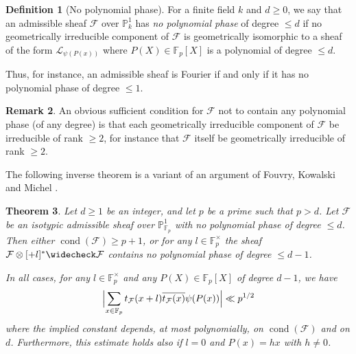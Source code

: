 \documentclass[12pt,a4paper,reqno]{amsart}
\numberwithin{equation}{section}
\DeclareMathOperator*\cond{cond}
\theoremstyle{plain}
\newtheorem{theorem}{Theorem}[section]
\theoremstyle{definition}
\newtheorem{definition}[theorem]{Definition}
\newtheorem{remark}[theorem]{Remark}
\newcommand\F{\mathbb{F}}
\newcommand\ov{\overline}
\newcommand\wcheck{\widecheck}
\newcommand\mcF{\mathcal{F}}
\newcommand\mcL{\mathcal{L}}
\newcommand\Pl{\mathbb{P}^1}
\newcommand\Fp{\F_{p}}
\newcommand\Fpt{\F_{p}^{\times}}
\begin{document}
\begin{definition}[No polynomial phase]
  For a finite field $k$ and $d\geq 0$, we say that an admissible
  sheaf $\mcF$ over $\Pl_k$ has \emph{no polynomial phase} of degree
  $\leq d$ if no geometrically irreducible component of $\mcF$ is
  geometrically isomorphic to a sheaf of the form $\mcL_{\psi(P(x))}$
  where $P(X)\in\Fp[X]$ is a polynomial of degree $\leq d$.
\end{definition}

Thus, for instance, an admissible sheaf is Fourier if and only if it
has no polynomial phase of degree $\leq 1$.

\begin{remark}\label{irrednopolynomialphase} 
  An obvious sufficient condition for $\mcF$ not to contain any
  polynomial phase (of any degree) is that each geometrically
  irreducible component of $\mcF$ be irreducible of rank $\geq 2$, for
  instance that $\mcF$ itself be geometrically irreducible of rank
  $\geq 2$.
\end{remark}

The following inverse theorem is a variant of an argument of Fouvry,
Kowalski and Michel \cite[Lemma 5.4]{FKMGowersnorms}.

\begin{theorem}\label{th-pol-phase}
  Let $d\geq 1$ be an integer, and let $p$ be a prime such that
  $p>d$. Let $\mcF$ be an isotypic admissible sheaf over $\Pl_{\Fp}$
  with no polynomial phase of degree $\leq d$.
  Then either $\cond(\mcF)\geq p+1$, or for any $l\in\Fp^\times$ the
  sheaf $\mcF\otimes[+l]^*\wcheck\mcF$ contains no polynomial phase of
  degree $\leq d-1$. 
\par
In all cases, for any $l\in\Fpt$ and any $P(X)\in\Fp[X]$ of degree
$d-1$, we have
\begin{equation}\label{squarerootforWeylshifts}
  \Bigl|\sum_{x\in\Fp}t_\mcF(x+l)\ov{t_\mcF(x)}\psi(P(x))\Bigr|\ll p^{1/2}
\end{equation}
where the implied constant depends, at most polynomially, on
$\cond(\mcF)$ and on $d$.  Furthermore, this estimate holds also if
$l=0$ and $P(x)=hx$ with $h\neq 0$.
\end{theorem}

\end{document}
